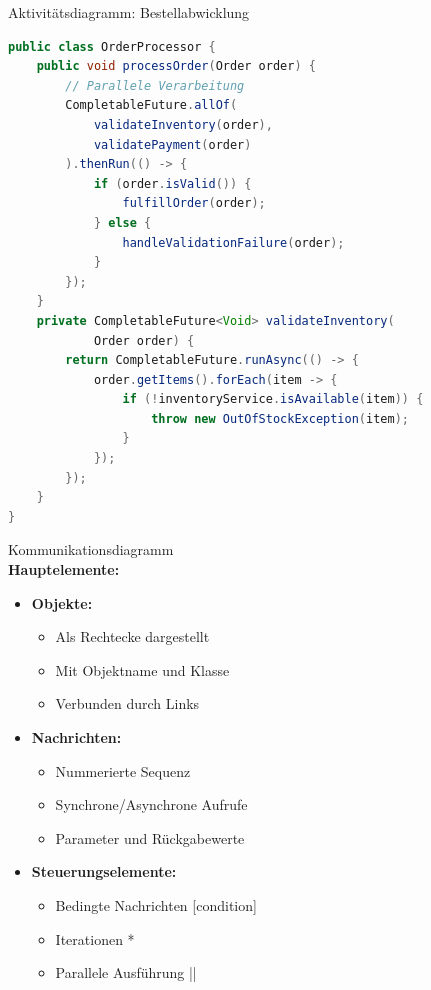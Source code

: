 \begin{example2}{Aktivitätsdiagramm: Bestellabwicklung}
\begin{lstlisting}[language=Java, style=basesmol]
public class OrderProcessor {
    public void processOrder(Order order) {
        // Parallele Verarbeitung
        CompletableFuture.allOf(
            validateInventory(order),
            validatePayment(order)
        ).thenRun(() -> {
            if (order.isValid()) {
                fulfillOrder(order);
            } else {
                handleValidationFailure(order);
            }
        });
    }
    private CompletableFuture<Void> validateInventory(
            Order order) {
        return CompletableFuture.runAsync(() -> {
            order.getItems().forEach(item -> {
                if (!inventoryService.isAvailable(item)) {
                    throw new OutOfStockException(item);
                }
            });
        });
    }
}
\end{lstlisting}
\end{example2}

\begin{definition}{Kommunikationsdiagramm}\\
\textbf{Hauptelemente:}
\begin{itemize}
    \item \textbf{Objekte:}
    \begin{itemize}
        \item Als Rechtecke dargestellt
        \item Mit Objektname und Klasse
        \item Verbunden durch Links
    \end{itemize}
    
    \item \textbf{Nachrichten:}
    \begin{itemize}
        \item Nummerierte Sequenz
        \item Synchrone/Asynchrone Aufrufe
        \item Parameter und Rückgabewerte
    \end{itemize}
    
    \item \textbf{Steuerungselemente:}
    \begin{itemize}
        \item Bedingte Nachrichten [condition]
        \item Iterationen *
        \item Parallele Ausführung || 
    \end{itemize}
\end{itemize}
\end{definition}


